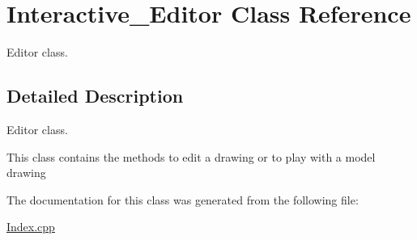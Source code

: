 \hypertarget{classInteractive__Editor}{}\section{Interactive\+\_\+\+Editor Class Reference}
\label{classInteractive__Editor}


Editor class.  




\subsection{Detailed Description}
Editor class. 

This class contains the methods to edit a drawing or to play with a model drawing 

The documentation for this class was generated from the following file\+:\begin{DoxyCompactItemize}
\item 
\hyperlink{Index_8cpp}{Index.\+cpp}\end{DoxyCompactItemize}

